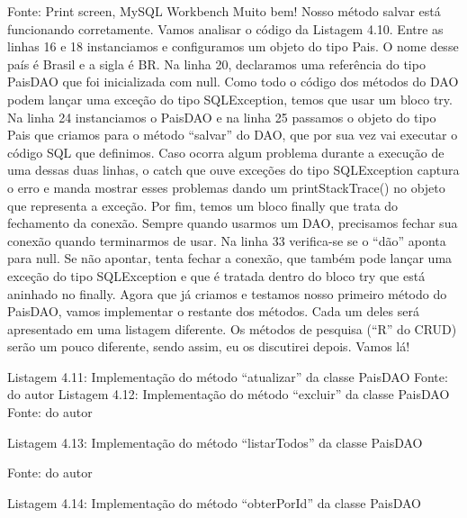 Fonte: Print screen, MySQL Workbench
Muito bem! Nosso método salvar está funcionando corretamente. Vamos analisar o código da Listagem 4.10. Entre as linhas 16 e 18 instanciamos e configuramos um objeto do tipo Pais. O nome desse país é Brasil e a sigla é BR. Na linha 20, declaramos uma referência do tipo PaisDAO que foi inicializada com null. Como todo o código dos métodos do DAO podem lançar uma exceção do tipo SQLException, temos que usar um bloco try. Na linha 24 instanciamos o PaisDAO e na linha 25 passamos o objeto do tipo Pais que criamos para o método “salvar” do DAO, que por sua vez vai executar o código SQL que definimos. Caso ocorra algum problema durante a execução de uma dessas duas linhas, o catch que ouve exceções do tipo SQLException captura o erro e manda mostrar esses problemas dando um printStackTrace() no objeto que representa a exceção. Por fim, temos um bloco finally que trata do fechamento da conexão. Sempre quando usarmos um DAO, precisamos fechar sua conexão quando terminarmos de usar. Na linha 33 verifica-se se o “dão” aponta para null. Se não apontar, tenta fechar a conexão, que também pode lançar uma exceção do tipo SQLException e que é tratada dentro do bloco try que está aninhado no finally.
Agora que já criamos e testamos nosso primeiro método do PaisDAO, vamos implementar o restante dos métodos. Cada um deles será apresentado em uma listagem diferente. Os métodos de pesquisa (“R” do CRUD) serão um pouco diferente, sendo assim, eu os discutirei depois. Vamos lá!


Listagem 4.11: Implementação do método “atualizar” da classe PaisDAO
 Fonte: do autor
Listagem 4.12: Implementação do método “excluir” da classe PaisDAO
 Fonte: do autor










Listagem 4.13: Implementação do método “listarTodos” da classe PaisDAO
 
Fonte: do autor













Listagem 4.14: Implementação do método “obterPorId” da classe PaisDAO
 
